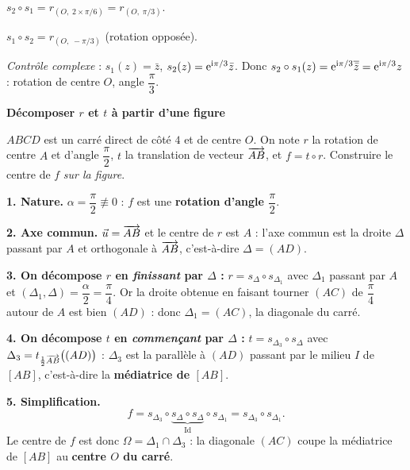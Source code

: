 $s_2\circ s_1 = r_{(O,\;2\times\pi/6)} = r_{(O,\;\pi/3)}$.

$s_1\circ s_2 = r_{(O,\;-\pi/3)}$ (rotation opposée).

\emph{Contrôle complexe} : $s_1(z)=\bar z$, $s_2(z)=\mathrm{e}^{\mathrm{i}\pi/3}\bar z$.
Donc $s_2\circ s_1(z)=\mathrm{e}^{\mathrm{i}\pi/3}\overline{\bar z}=\mathrm{e}^{\mathrm{i}\pi/3}z$ :
rotation de centre $O$, angle $\dfrac{\pi}{3}$. \checkmark

\exerciceresolu
\textbf{Décomposer $r$ et $t$ à partir d'une figure}

$ABCD$ est un carré direct de côté $4$ et de centre $O$. On note $r$ la
rotation de centre $A$ et d'angle $\dfrac{\pi}{2}$, $t$ la translation de
vecteur $\overrightarrow{AB}$, et $f = t\circ r$. Construire le centre de $f$
\emph{sur la figure}.

\solution

\textbf{1. Nature.} $\alpha=\dfrac{\pi}{2}\not\equiv 0$ : $f$ est une
\textbf{rotation d'angle $\dfrac{\pi}{2}$}.

\textbf{2. Axe commun.} $\vec u=\overrightarrow{AB}$ et le centre de $r$ est $A$ :
l'axe commun est la droite $\Delta$ passant par $A$ et orthogonale à
$\overrightarrow{AB}$, c'est-à-dire $\Delta=(AD)$.

\textbf{3. On décompose $r$ en \emph{finissant} par $\Delta$ :}
$r=s_{\Delta}\circ s_{\Delta_1}$ avec $\Delta_1$ passant par $A$ et
$(\Delta_1,\Delta)=\dfrac{\alpha}{2}=\dfrac{\pi}{4}$. Or la droite obtenue en
faisant tourner $(AC)$ de $\dfrac{\pi}{4}$ autour de $A$ est bien $(AD)$ :
donc $\Delta_1=(AC)$, la diagonale du carré.

\textbf{4. On décompose $t$ en \emph{commençant} par $\Delta$ :}
$t=s_{\Delta_3}\circ s_{\Delta}$ avec $\Delta_3=t_{\frac12\overrightarrow{AB}}\bigl((AD)\bigr)$ :
$\Delta_3$ est la parallèle à $(AD)$ passant par le milieu $I$ de $[AB]$,
c'est-à-dire la \textbf{médiatrice de $[AB]$}.

\textbf{5. Simplification.}
$$
f=s_{\Delta_3}\circ\underbrace{s_{\Delta}\circ s_{\Delta}}_{\mathrm{Id}}\circ s_{\Delta_1}
 = s_{\Delta_3}\circ s_{\Delta_1}.
$$
Le centre de $f$ est donc $\Omega=\Delta_1\cap\Delta_3$ : la diagonale $(AC)$
coupe la médiatrice de $[AB]$ au \textbf{centre $O$ du carré}.


